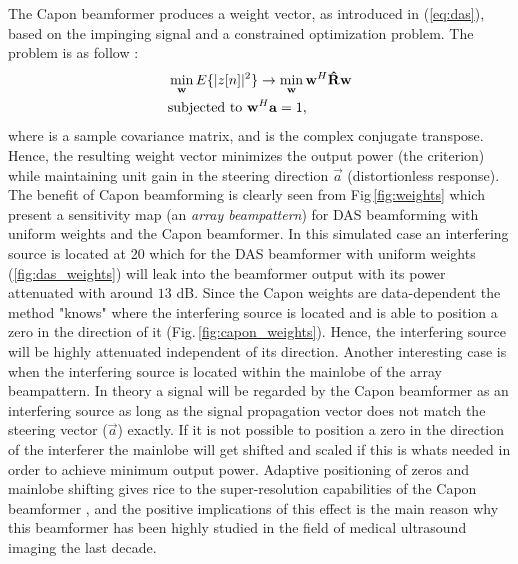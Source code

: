 The Capon beamformer produces a weight vector, as introduced in (\ref{eq:das}), based on the impinging signal and a constrained optimization problem. The problem is as follow \cite{Capon1969}:
\begin{align}
&\min_{\mathbf{w}} E\{|z[n]|^2\} \rightarrow \min_{\mathbf{w}} \mathbf{w}^H \mathbf{\hat{R}} \mathbf{w} \label{eq:capon_optimization_criteria} \\
&\text{subjected to } \mathbf{w}^H\mathbf{a} = 1,
\end{align}
where  is a sample covariance matrix, and  is the complex conjugate transpose. Hence, the resulting weight vector minimizes the output power (the criterion) while maintaining unit gain in the steering direction $\vec{a}$ (distortionless response). The benefit of Capon beamforming is clearly seen from Fig\,\ref{fig:weights} which present a sensitivity map (an \textit{array beampattern}) for DAS beamforming with uniform weights and the Capon beamformer. In this simulated case an interfering source is located at 20\degree{} which for the DAS beamformer with uniform weights (\ref{fig:das_weights}) will leak into the beamformer output with its power attenuated with around $13$ dB. Since the Capon weights are data-dependent the method "knows" where the interfering source is located and is able to position a zero in the direction of it (Fig.\,\ref{fig:capon_weights}). Hence, the interfering source will be highly attenuated independent of its direction. Another interesting case is when the interfering source is located within the mainlobe of the array beampattern. In theory a signal will be regarded by the Capon beamformer as an interfering source as long as the signal propagation vector does not match the steering vector ($\vec{a}$) exactly. If it is not possible to position a zero in the direction of the interferer the mainlobe will get shifted and scaled if this is whats needed in order to achieve minimum output power. Adaptive positioning of zeros and mainlobe shifting gives rice to the super-resolution capabilities of the Capon beamformer \cite{Synnevag2007}, and the positive implications of this effect \cite{Synnevag2009} is the main reason why this beamformer has been highly studied in the field of medical ultrasound imaging the last decade.

